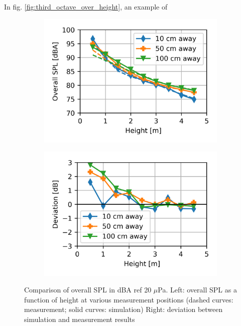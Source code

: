 In fig. \ref{fig:third_octave_over_height}, an example of 


\begin{figure}[H]
	\centering
	\begin{subfigure}[b]{0.49\textwidth}
		\centering
		\includegraphics{fig/chap5/initial_model/overall_SPL/all_pos.png}
	\end{subfigure}
	\begin{subfigure}[b]{0.49\textwidth}
		\centering
		\includegraphics{fig/chap5/initial_model/overall_SPL/deviation.png}
	\end{subfigure}
	\caption{Comparison of overall SPL in dBA ref 20 $\mu$Pa. Left: overall SPL as a function of height at various measurement positions (dashed curves: measurement; solid curves: simulation) Right: deviation between simulation and measurement results}
	\label{fig:overall_SPL}
\end{figure}

